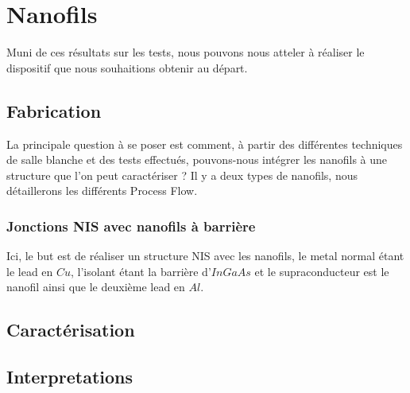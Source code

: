 \chapter{Nanofils}
\label{Chap4}
Muni de ces résultats sur les tests, nous pouvons nous atteler à réaliser le dispositif que nous souhaitions obtenir au départ.
       
    \section{Fabrication}
        La principale question à se poser est comment, à partir des différentes techniques de salle blanche et des tests effectués, pouvons-nous intégrer les nanofils à une structure que l'on peut caractériser ? Il y a deux types de nanofils, nous détaillerons les différents Process Flow.
        
        \subsection{Jonctions NIS avec nanofils à barrière}
        
        Ici, le but est de réaliser un structure NIS avec les nanofils, le metal normal étant le lead en $Cu$, l'isolant étant la barrière d'$InGaAs$ et le supraconducteur est le nanofil ainsi que le deuxième lead en $Al$.
        
        \begin{figure}
            \centering
            
        \end{figure}
        
        
        
        
    \section{Caractérisation}

    \section{Interpretations}
